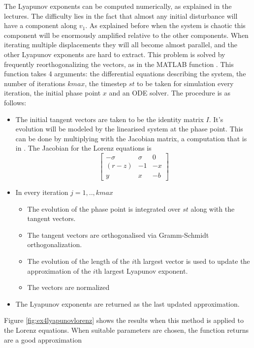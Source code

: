 The Lyapunov exponents can be computed numerically, as explained in the lectures. The difficulty lies in the fact that almost any initial disturbance will have a component along $v_1$. As explained before when the system is chaotic this component will be enormously amplified relative to the other components. When iterating multiple displacements they will all become almost parallel, and the other Lyapunov exponents are hard to extract. This problem is solved by frequently reorthogonalizing the vectors, as in the MATLAB function . This function takes 4 arguments: the differential equations describing the system, the number of iterations $kmax$, the timestep $st$ to be taken for simulation every iteration, the initial phase point $x$ and an ODE solver. The procedure is as follows:
\begin{itemize}
\item The initial tangent vectors are taken to be the identity matrix $I$. It's evolution will be modeled by the linearised system at the phase point. This can be done by multiplying with the Jacobian matrix, a computation that is in . The Jacobian for the Lorenz equations is
\begin{equation}
\begin{bmatrix} -\sigma&  \sigma   & 0\\
 (r-z)  &  -1  &   -x \\
  y  &     x &    -b\end{bmatrix}
\end{equation}
\item In every iteration $j=1,..,kmax$
\begin{itemize}
\item The evolution of the phase point is integrated over $st$ along with the tangent vectors.
\item The tangent vectors are orthogonalised via Gramm-Schmidt orthogonalization.
\item The evolution of the length of the $i$th largest vector is used to update the approximation of the $i$th largest Lyapunov exponent. 
\item The vectors are normalized
\end{itemize}
\item The Lyapunov exponents are returned as the last updated approximation.
\end{itemize}
Figure \ref{fig:ex4lyapunovlorenz} shows the results when this method is applied to the Lorenz equations. When suitable parameters are chosen, the function returns are a good approximation
